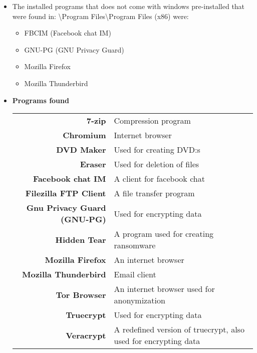 \begin{enumerate}
\begin{itemize}
	\item The installed programs that does not come with windows pre-installed that were found in:
	\textbackslash Program Files\textbackslash Program Files (x86) were:
	
	\begin{itemize}
		\item FBCIM (Facebook chat IM) 
		\item GNU-PG (GNU Privacy Guard) 
		\item Mozilla Firefox
		\item Mozilla Thunderbird
	\end{itemize}
	
	\newpage
	\item \textbf{Programs found}
	
	\begin{tabular}{|r|l|}
		\hline
		\textbf{7-zip} & Compression program \\
		\textbf{Chromium} & Internet browser \\
		\textbf{DVD Maker} & Used for creating DVD:s \\
		\textbf{Eraser} & Used for deletion of files \\
		\textbf{Facebook chat IM} & A client for facebook chat \\
		\textbf{Filezilla FTP Client} & A file transfer program \\
		\textbf{Gnu Privacy Guard (GNU-PG)} & Used for encrypting data \\
		\textbf{Hidden Tear} & A program used for creating ransomware \\
		\textbf{Mozilla Firefox} & An internet browser \\
		\textbf{Mozilla Thunderbird} & Email client \\
		\textbf{Tor Browser} & An internet browser used for anonymization \\
		\textbf{Truecrypt} & Used for encrypting data \\
		\textbf{Veracrypt} & A redefined version of truecrypt, also used for encrypting data \\
		\hline
	\end{tabular}
	

\end{itemize}
\end{enumerate}
